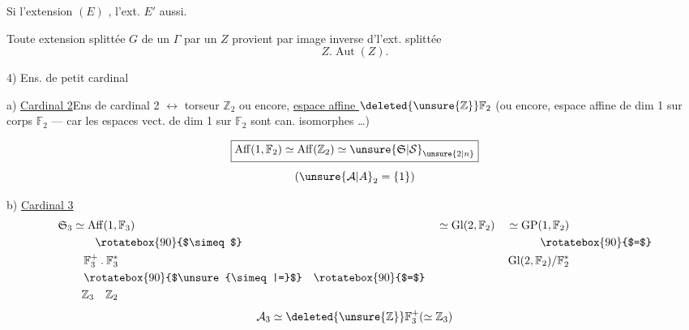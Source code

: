 
Si l'extension $(E)$ , l'ext. $E'$ aussi.

 Toute extension splittée $G$ de un $\Gamma$ par un $Z$ provient par image inverse d'l'ext. splittée
\[
Z.\operatorname{Aut}(Z).
\]


4) \quad Ens. de petit cardinal

a) \uline{Cardinal 2}\qquad Ens de cardinal 2 $\longleftrightarrow$ torseur  $\mathbb{Z}_2$ ou encore, \uline{espace affine } $\deleted{\unsure{\mathbb{Z}}}\mathbb{F}_2$ (ou encore,  espace affine de dim 1 sur corps $\mathbb{F}_2$ --- car les espaces vect. de dim 1 sur $\mathbb{F}_2$ sont can. isomorphes \ldots)

\[
\boxed{\operatorname{Aff}(1,\mathbb{F}_2)\simeq
 \operatorname{Aff}(\mathbb{Z}_2)\simeq\unsure{\mathfrak{S}|\mathcal{S}}_{\unsure{2|n}}}
\]
\[
(\unsure{\mathcal{A}|A}_2=\{1\})
\]

b) \uline{Cardinal 3}
\[
\begin{aligned}
\mathfrak{S}_3&\simeq\operatorname{Aff}(1,\mathbb{F}_3)&
 &\simeq\operatorname{Gl}(2,\mathbb{F}_2)&
 &\simeq\operatorname{GP}(1,\mathbb{F}_2)\\
&\hspace{2em}\rotatebox{90}{$\simeq$}&&&&\hspace{3em}\rotatebox{90}{$=$}\\
&\hspace{1em}\mathbb{F}_3^{+}\mathbin{.}\mathbb{F}_3^{*}
 &&&&\operatorname{Gl}(2,\mathbb{F}_2)/\mathbb{F}_2^{*}\\
&\hspace{1em}\rotatebox{90}{$\unsure{\simeq|=}$}
 \quad\rotatebox{90}{$=$}\\
&\hspace{.8em}\mathbb{Z}_3\quad\mathbb{Z}_2
\end{aligned}
\]
\[
\mathcal{A}_3\simeq\deleted{\unsure{\mathbb{Z}}}\mathbb{F}_3^{+}(\simeq\mathbb{Z}_3)
\]

